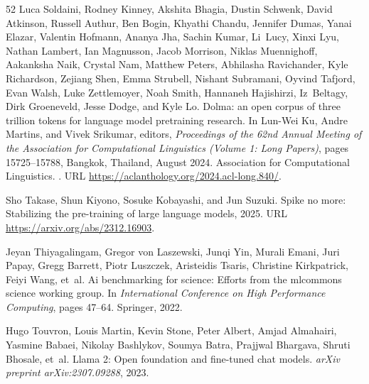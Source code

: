\begin{thebibliography}{52}
Luca Soldaini, Rodney Kinney, Akshita Bhagia, Dustin Schwenk, David Atkinson, Russell Authur, Ben Bogin, Khyathi Chandu, Jennifer Dumas, Yanai Elazar, Valentin Hofmann, Ananya Jha, Sachin Kumar, Li~Lucy, Xinxi Lyu, Nathan Lambert, Ian Magnusson, Jacob Morrison, Niklas Muennighoff, Aakanksha Naik, Crystal Nam, Matthew Peters, Abhilasha Ravichander, Kyle Richardson, Zejiang Shen, Emma Strubell, Nishant Subramani, Oyvind Tafjord, Evan Walsh, Luke Zettlemoyer, Noah Smith, Hannaneh Hajishirzi, Iz~Beltagy, Dirk Groeneveld, Jesse Dodge, and Kyle Lo.
\newblock Dolma: an open corpus of three trillion tokens for language model pretraining research.
\newblock In Lun-Wei Ku, Andre Martins, and Vivek Srikumar, editors, \emph{Proceedings of the 62nd Annual Meeting of the Association for Computational Linguistics (Volume 1: Long Papers)}, pages 15725--15788, Bangkok, Thailand, August 2024. Association for Computational Linguistics.
\newblock {}.
\newblock URL \url{https://aclanthology.org/2024.acl-long.840/}.

Sho Takase, Shun Kiyono, Sosuke Kobayashi, and Jun Suzuki.
\newblock Spike no more: Stabilizing the pre-training of large language models, 2025.
\newblock URL \url{https://arxiv.org/abs/2312.16903}.

Jeyan Thiyagalingam, Gregor von Laszewski, Junqi Yin, Murali Emani, Juri Papay, Gregg Barrett, Piotr Luszczek, Aristeidis Tsaris, Christine Kirkpatrick, Feiyi Wang, et~al.
\newblock Ai benchmarking for science: Efforts from the mlcommons science working group.
\newblock In \emph{International Conference on High Performance Computing}, pages 47--64. Springer, 2022.

Hugo Touvron, Louis Martin, Kevin Stone, Peter Albert, Amjad Almahairi, Yasmine Babaei, Nikolay Bashlykov, Soumya Batra, Prajjwal Bhargava, Shruti Bhosale, et~al.
\newblock Llama 2: Open foundation and fine-tuned chat models.
\newblock \emph{arXiv preprint arXiv:2307.09288}, 2023.


\end{thebibliography}
